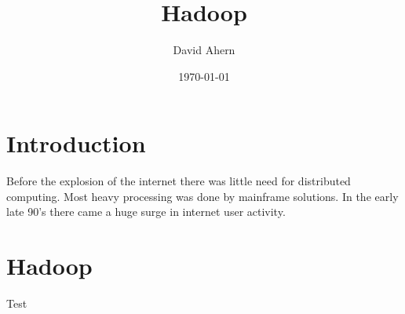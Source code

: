 \documentclass{beamer}
\title{Hadoop}
\date{\today}
\author{David Ahern}
\institute{Cork Institute of Technology}
\begin{document}
  \maketitle

  \tableofcontents

  \section{Introduction}
  
   Before the explosion of the internet there was little need for distributed computing. Most heavy processing was done by mainframe solutions. In the early late 90's there came a huge surge in internet user activity. 
  
  \section{Hadoop}
  Test
\end{document}
